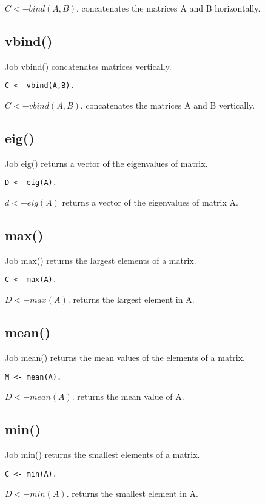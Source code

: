 \documentclass[prodmode,acmtecs]{acmsmall}
\begin{document}
$C <- bind(A,B).$ concatenates the matrices A and B horizontally.
\medskip

\subsection{vbind()}
Job vbind() concatenates matrices vertically.
\begin{lstlisting}
C <- vbind(A,B).
\end{lstlisting}

$C <- vbind(A,B).$ concatenates the matrices A and B vertically.
\medskip

\subsection{eig()}
Job eig() returns a vector of the eigenvalues of matrix.
\begin{lstlisting}
D <- eig(A).
\end{lstlisting}

$d <- eig(A)$ returns a vector of the eigenvalues of matrix A.
\medskip

\subsection{max()}
Job max() returns the largest elements of a matrix.
\begin{lstlisting}
C <- max(A).
\end{lstlisting}

$D <- max(A).$ returns the largest element in A.
\medskip

\subsection{mean()}
Job mean() returns the mean values of the elements of a matrix.
\begin{lstlisting}
M <- mean(A).
\end{lstlisting}

$D <- mean(A).$ returns the mean value of A.
\medskip

\subsection{min()}
Job min() returns the smallest elements of a matrix.
\begin{lstlisting}
C <- min(A).
\end{lstlisting}

$D <- min(A).$ returns the smallest element in A.
\medskip
\end{document}
